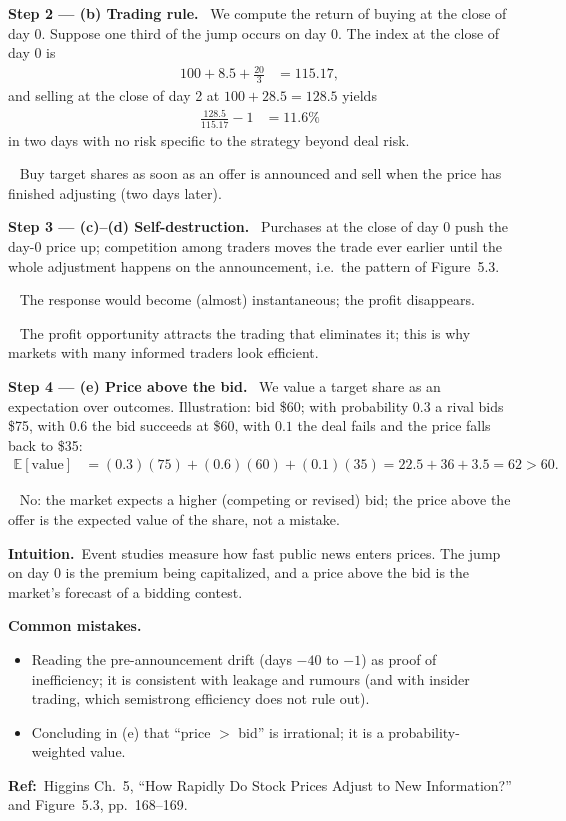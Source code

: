 \documentclass[11pt,a4paper]{article}
\newcommand{\step}[2]{\par\medskip\noindent\textbf{Step #1 --- #2.}~}
\newcommand{\intuition}{\par\medskip\noindent\textbf{Intuition.}~}
\newcommand{\refbib}{\par\smallskip\noindent\textbf{Ref:}~}
\newcommand{\answer}[1]{\par\smallskip\noindent\fbox{\textbf{Answer #1.}}~}
\newcommand{\pitfalls}{\par\medskip\noindent\textbf{Common mistakes.}}
\newcommand{\E}{\mathbb{E}}
\begin{document}
\step{2}{(b) Trading rule} We compute the return of buying at the close of day 0. Suppose one third of the
jump occurs on day 0. The index at the close of day 0 is
\begin{align}
  100+8.5+\frac{20}{3} &= 115.17, \label{r9e3-day0}
\end{align}
and selling at the close of day 2 at $100+28.5=128.5$ yields
\begin{align}
  \frac{128.5}{115.17}-1 &= 11.6\% \label{r9e3-ret}
\end{align}
in two days with no risk specific to the strategy beyond deal risk.
\answer{(b)} Buy target shares as soon as an offer is announced and sell when the price has finished
adjusting (two days later).

\step{3}{(c)--(d) Self-destruction} Purchases at the close of day 0 push the day-0 price up; competition
among traders moves the trade ever earlier until the whole adjustment happens on the announcement, i.e.\
the pattern of Figure~5.3.
\answer{(c)} The response would become (almost) instantaneous; the profit disappears.
\answer{(d)} The profit opportunity attracts the trading that eliminates it; this is why markets with
many informed traders look efficient.

\step{4}{(e) Price above the bid} We value a target share as an expectation over outcomes. Illustration:
bid \$60; with probability $0.3$ a rival bids \$75, with $0.6$ the bid succeeds at \$60, with $0.1$ the deal
fails and the price falls back to \$35:
\begin{align}
  \E[\text{value}] &= (0.3)(75)+(0.6)(60)+(0.1)(35) = 22.5+36+3.5 = 62 > 60. \label{r9e3-exp}
\end{align}
\answer{(e)} No: the market expects a higher (competing or revised) bid; the price above the offer is the
expected value of the share, not a mistake.

\intuition Event studies measure how fast public news enters prices. The jump on day 0 is the
premium being capitalized, and a price above the bid is the market's forecast of a bidding contest.
\pitfalls
\begin{itemize}
  \item Reading the pre-announcement drift (days $-40$ to $-1$) as proof of inefficiency; it is consistent with
        leakage and rumours (and with insider trading, which semistrong efficiency does not rule out).
  \item Concluding in (e) that ``price $>$ bid'' is irrational; it is a probability-weighted value.
\end{itemize}
\refbib{Higgins Ch.~5, ``How Rapidly Do Stock Prices Adjust to New Information?'' and Figure~5.3, pp.~168--169.}
\end{document}
